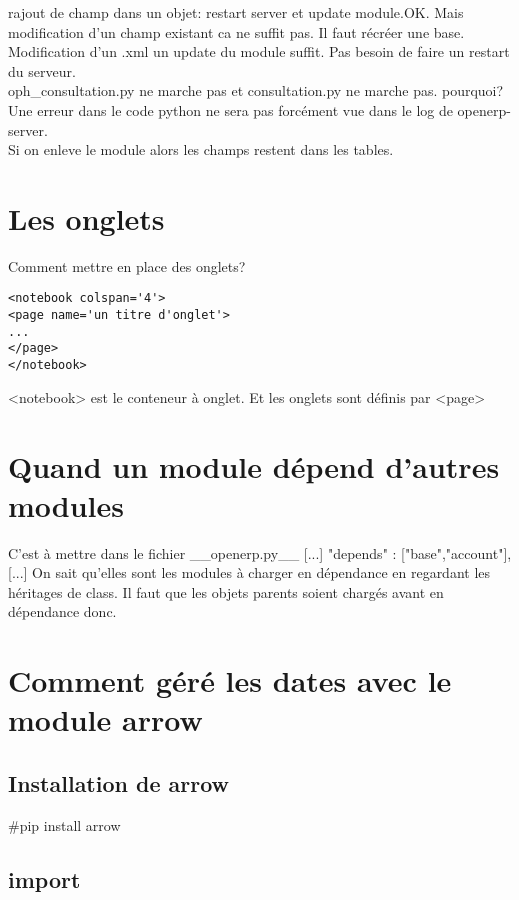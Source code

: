 \documentclass[12pt,a4paper]{article}
\begin{document}
rajout de champ dans un objet: restart server et update module.OK. Mais modification d'un champ existant ca ne suffit pas. Il faut récréer une base.\\
Modification d'un .xml un update du module suffit. Pas besoin de faire un restart du serveur.\\
oph\_consultation.py ne marche pas et consultation.py ne marche pas. pourquoi?\\Une erreur dans le code python ne sera pas forcément vue dans le log de openerp-server.\\
Si on enleve le module alors les champs restent dans les tables.\\

\section{Les onglets}
\label{sec:onglets}

Comment mettre en place des onglets?
\begin{verbatim}
<notebook colspan='4'>
<page name='un titre d'onglet'>
...
</page>
</notebook>
\end{verbatim}
<notebook> est le conteneur à onglet. Et les onglets sont définis par <page>

\section{Quand un module dépend d’autres modules}
\label{sec:depends}

C’est à mettre dans le fichier \_\_openerp.py\_\_ [...] "depends" : ["base","account"], [...]
On sait qu’elles sont les modules à charger en dépendance en regardant les héritages de class. Il faut que les objets parents soient chargés avant en dépendance donc.

\section{Comment géré les dates avec le module arrow}
\label{sec:arrow}

\subsection{Installation de arrow}
\label{sec:install}

#pip install arrow

\subsection{import}
\label{sec:import}
\end{document}
